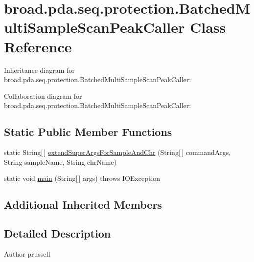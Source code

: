 \hypertarget{classbroad_1_1pda_1_1seq_1_1protection_1_1_batched_multi_sample_scan_peak_caller}{\section{broad.\+pda.\+seq.\+protection.\+Batched\+Multi\+Sample\+Scan\+Peak\+Caller Class Reference}
\label{classbroad_1_1pda_1_1seq_1_1protection_1_1_batched_multi_sample_scan_peak_caller}
}


Inheritance diagram for broad.\+pda.\+seq.\+protection.\+Batched\+Multi\+Sample\+Scan\+Peak\+Caller\+:


Collaboration diagram for broad.\+pda.\+seq.\+protection.\+Batched\+Multi\+Sample\+Scan\+Peak\+Caller\+:
\subsection*{Static Public Member Functions}
\begin{DoxyCompactItemize}
\item 
static String\mbox{[}$\,$\mbox{]} \hyperlink{classbroad_1_1pda_1_1seq_1_1protection_1_1_batched_multi_sample_scan_peak_caller_ac18b0992e8a87cb7a87840274898f420}{extend\+Super\+Args\+For\+Sample\+And\+Chr} (String\mbox{[}$\,$\mbox{]} command\+Args, String sample\+Name, String chr\+Name)
\item 
static void \hyperlink{classbroad_1_1pda_1_1seq_1_1protection_1_1_batched_multi_sample_scan_peak_caller_a67eab2bdc03b1ac2718fd5c3482af7c4}{main} (String\mbox{[}$\,$\mbox{]} args)  throws I\+O\+Exception 
\end{DoxyCompactItemize}
\subsection*{Additional Inherited Members}


\subsection{Detailed Description}
\begin{DoxyAuthor}{Author}
prussell 
\end{DoxyAuthor}


